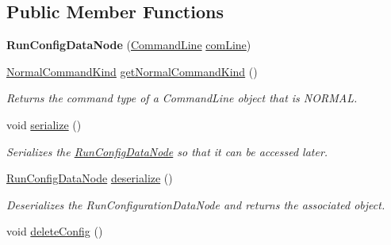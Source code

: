 \subsection*{Public Member Functions}
\begin{DoxyCompactItemize}
\item 
\hypertarget{classedu_1_1udel_1_1cis_1_1vsl_1_1civl_1_1gui_1_1common_1_1RunConfigDataNode_a7925990db6374cc2201a3dcd268bd526}{}{\bfseries Run\+Config\+Data\+Node} (\hyperlink{interfaceedu_1_1udel_1_1cis_1_1vsl_1_1civl_1_1run_1_1IF_1_1CommandLine}{Command\+Line} \hyperlink{classedu_1_1udel_1_1cis_1_1vsl_1_1civl_1_1gui_1_1common_1_1RunConfigDataNode_a01d188ef90f00c0195c88dbf9c2d5891}{com\+Line})\label{classedu_1_1udel_1_1cis_1_1vsl_1_1civl_1_1gui_1_1common_1_1RunConfigDataNode_a7925990db6374cc2201a3dcd268bd526}

\item 
\hyperlink{enumedu_1_1udel_1_1cis_1_1vsl_1_1civl_1_1run_1_1common_1_1NormalCommandLine_1_1NormalCommandKind}{Normal\+Command\+Kind} \hyperlink{classedu_1_1udel_1_1cis_1_1vsl_1_1civl_1_1gui_1_1common_1_1RunConfigDataNode_a56ffd102d9fe57bd712c7c8da4f6ab09}{get\+Normal\+Command\+Kind} ()
\begin{DoxyCompactList}\small\item\em Returns the command type of a Command\+Line object that is N\+O\+R\+M\+A\+L. \end{DoxyCompactList}\item 
\hypertarget{classedu_1_1udel_1_1cis_1_1vsl_1_1civl_1_1gui_1_1common_1_1RunConfigDataNode_acc7dc95e4b7f5766f64ddc48c513d56f}{}void \hyperlink{classedu_1_1udel_1_1cis_1_1vsl_1_1civl_1_1gui_1_1common_1_1RunConfigDataNode_acc7dc95e4b7f5766f64ddc48c513d56f}{serialize} ()\label{classedu_1_1udel_1_1cis_1_1vsl_1_1civl_1_1gui_1_1common_1_1RunConfigDataNode_acc7dc95e4b7f5766f64ddc48c513d56f}

\begin{DoxyCompactList}\small\item\em Serializes the \hyperlink{classedu_1_1udel_1_1cis_1_1vsl_1_1civl_1_1gui_1_1common_1_1RunConfigDataNode}{Run\+Config\+Data\+Node} so that it can be accessed later. \end{DoxyCompactList}\item 
\hyperlink{classedu_1_1udel_1_1cis_1_1vsl_1_1civl_1_1gui_1_1common_1_1RunConfigDataNode}{Run\+Config\+Data\+Node} \hyperlink{classedu_1_1udel_1_1cis_1_1vsl_1_1civl_1_1gui_1_1common_1_1RunConfigDataNode_a1d6a9da96e2cb2611b313c3962796428}{deserialize} ()
\begin{DoxyCompactList}\small\item\em Deserializes the Run\+Configuration\+Data\+Node and returns the associated object. \end{DoxyCompactList}\item 
\hypertarget{classedu_1_1udel_1_1cis_1_1vsl_1_1civl_1_1gui_1_1common_1_1RunConfigDataNode_aef2160176670685da5d591b3b8b0c614}{}void \hyperlink{classedu_1_1udel_1_1cis_1_1vsl_1_1civl_1_1gui_1_1common_1_1RunConfigDataNode_aef2160176670685da5d591b3b8b0c614}{delete\+Config} ()\label{classedu_1_1udel_1_1cis_1_1vsl_1_1civl_1_1gui_1_1common_1_1RunConfigDataNode_aef2160176670685da5d591b3b8b0c614}


\end{DoxyCompactItemize}
